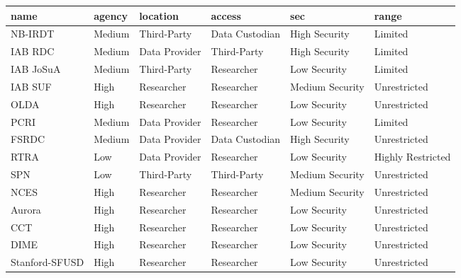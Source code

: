 \begin{tabulary}{\ourtablewidth}{LLLLLL}
  \toprule
name & agency & location & access & sec & range \\ 
  \midrule
NB-IRDT & Medium & Third-Party & Data Custodian & High Security & Limited \\ 
  IAB RDC & Medium & Data Provider & Third-Party & High Security & Limited \\ 
  IAB JoSuA & Medium & Third-Party & Researcher & Low Security & Limited \\ 
  IAB SUF & High & Researcher & Researcher & Medium Security & Unrestricted \\ 
  OLDA & High & Researcher & Researcher & Low Security & Unrestricted \\ 
  PCRI & Medium & Data Provider & Researcher & Low Security & Limited \\ 
  FSRDC & Medium & Data Provider & Data Custodian & High Security & Unrestricted \\ 
  RTRA & Low & Data Provider & Researcher & Low Security & Highly Restricted \\ 
  SPN & Low & Third-Party & Third-Party & Medium Security & Unrestricted \\ 
  NCES & High & Researcher & Researcher & Medium Security & Unrestricted \\ 
  Aurora & High & Researcher & Researcher & Low Security & Unrestricted \\ 
  CCT & High & Researcher & Researcher & Low Security & Unrestricted \\ 
  DIME & High & Researcher & Researcher & Low Security & Unrestricted \\ 
  Stanford-SFUSD & High & Researcher & Researcher & Low Security & Unrestricted \\ 
   \bottomrule
\end{tabulary}
